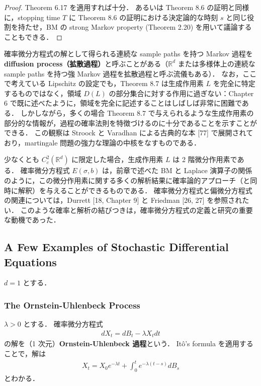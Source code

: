 \documentclass{jsarticle}
\begin{document}
\begin{proof}
    Theorem 6.17 を適用すれば十分．
    あるいは Theorem 8.6 の証明と同様に，stopping time $T$ に Theorem 8.6 の証明における決定論的な時刻 $s$ と同じ役割を持たせ，BM の strong Markov property (Theorem 2.20) を用いて議論することもできる．
\end{proof}

確率微分方程式の解として得られる連続な sample paths を持つ Markov 過程を \textbf{diffusion process（拡散過程）}と呼ぶことがある（$\mathbb{R}^d$ または多様体上の連続な sample paths を持つ強 Markov 過程を拡散過程と呼ぶ流儀もある）．
なお，ここで考えている Lipschitz の設定でも，Theorem 8.7 は生成作用素 $L$ を完全に特定するものではなく，領域 $D(L)$ の部分集合に対する作用に過ぎない：Chapter 6 で既に述べたように，領域を完全に記述することはしばしば非常に困難である．
しかしながら，多くの場合 Theorem 8.7 で与えられるような生成作用素の部分的な情報が，過程の確率法則を特徴づけるのに十分であることを示すことができる．
この観察は Stroock と Varadhan による古典的な本 [77] で展開されており，martingale 問題の強力な理論の中核をなすものである．

少なくとも $C_{c}^2(\mathbb{R}^d)$ に限定した場合，生成作用素 $L$ は 2 階微分作用素である．
確率微分方程式 $E(\sigma, b)$ は，前章で述べた BM と Laplace 演算子の関係のように，この微分作用素に関する多くの解析結果に確率論的アプローチ（と同時に解釈）を与えることができるものである．
確率微分方程式と偏微分方程式の関連については，Durrett [18, Chapter 9] と Friedman [26, 27] を参照されたい．
このような確率と解析の結びつきは，確率微分方程式の定義と研究の重要な動機であった．


\subsection{A Few Examples of Stochastic Differential Equations}

$d=1$ とする．

\subsubsection{The Ornstein-Uhlenbeck Process}

$\lambda>0$ とする．
確率微分方程式
\begin{align}
    dX_{t}
    = dB_{t} - \lambda X_{t}dt
\end{align}
の解を（1 次元）\textbf{Ornstein-Uhlenbeck 過程}という．
It\^{o}'s formula を適用することで，解は
\begin{align}
    X_{t}
    = X_{0}e^{-\lambda t}
    + \int_{0}^{t}e^{-\lambda(t-s)}dB_{s}
\end{align}
とわかる．
\end{document}

